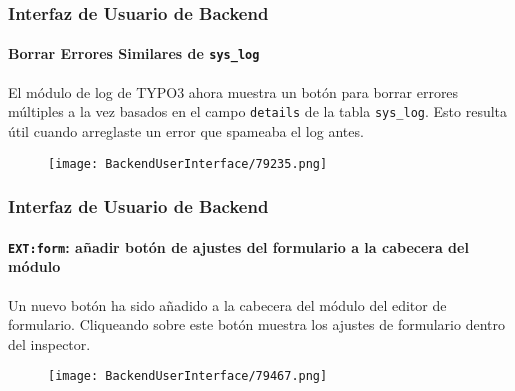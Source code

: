 \begin{frame}[fragile]
	\frametitle{Interfaz de Usuario de Backend}
	\framesubtitle{Borrar Errores Similares de \texttt{sys\_log}}

	El módulo de log de TYPO3 ahora muestra un botón para borrar errores múltiples a la vez basados en el
	campo \texttt{details} de la tabla \texttt{sys\_log}. Esto resulta útil cuando arreglaste
	un error que spameaba el log antes.

	\begin{figure}\vspace{-0.2cm}
		\texttt{[image: BackendUserInterface/79235.png]}
	\end{figure}

\end{frame}

\begin{frame}[fragile]
	\frametitle{Interfaz de Usuario de Backend}
	\framesubtitle{\texttt{EXT:form}: añadir botón de ajustes del formulario a la cabecera del módulo}

	Un nuevo botón ha sido añadido a la cabecera del módulo del editor de formulario.
	Cliqueando sobre este botón muestra los ajustes de formulario dentro del inspector.

	\begin{figure}\vspace{-0.2cm}
		\texttt{[image: BackendUserInterface/79467.png]}
	\end{figure}

\end{frame}

